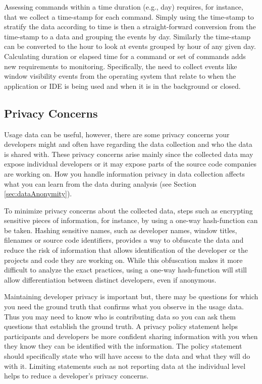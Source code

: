 Assessing commands within a time duration (e.g., day) requires, for instance, that we collect a time-stamp for each command.  Simply using the time-stamp to stratify the data according to time is then a straight-forward conversion from the time-stamp to a data and grouping the events by day.
Similarly the time-stamp can be converted to the hour to look at events grouped by hour of any given day. Calculating duration or elapsed time for a command or set of commands adds new requirements to monitoring.  Specifically, the need to collect events like window visibility events from the operating system that relate to when the application or IDE is being used and when it is in the background or closed.

\subsection{Privacy Concerns}

Usage data can be useful, however, there are some privacy concerns your developers might and often have regarding the data collection and who the data is shared with. These privacy concerns arise mainly since the collected data may expose individual developers or it may expose parts of the source code companies are working on.  How you handle information privacy in data collection affects what you can learn from the data during analysis (see Section \ref{sec:dataAnonymity}).

To minimize privacy concerns about the collected data, steps such as encrypting sensitive pieces of information, for instance, by using a one-way hash-function can be taken. Hashing sensitive names, such as developer names, window titles, filenames or source code identifiers, provides a way to obfuscate the data and reduce the risk of information that allows identification of the developer or the projects and code they are working on. While this obfuscation makes it more difficult to analyze the exact practices, using a one-way hash-function will still allow differentiation between distinct developers, even if anonymous.

Maintaining developer privacy is important but, there may be questions for which you need the ground truth that confirms what you observe in the usage data.  Thus you may need to know who is contributing data so you can ask them questions that establish the ground truth. A privacy policy statement helps participants and developers be more confident sharing information with you when they know they can be identified with the information.  The policy statement should specifically state who will have access to the data and what they will do with it. Limiting statements such as not reporting data at the individual level helps to reduce a developer's privacy concerns.

